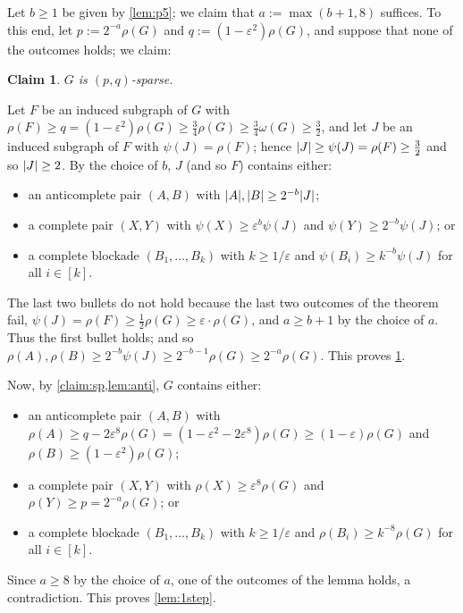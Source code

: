 \documentclass[11pt,reqno]{amsart}
\newtheorem{claim}{Claim}[theorem]
\let\oldendproof\endproof
\renewenvironment{proof}[1][\proofname]{%
	\oldproof[\normalfont\bfseries #1]%
}{\oldendproof}
\renewcommand{\qedsymbol}{$\blacksquare$}%
\newenvironment{subproof}[1][\normalfont\it Subproof]{%
	\renewcommand{\qedsymbol}{$\square$}%
	\begin{proof}[#1]%
	}{%
	\end{proof}%
}
\newcommand{\eps}{\varepsilon}
\DeclarePairedDelimiter\abs{\lvert}{\rvert}%
\begin{document}
	\begin{proof}
		Let $b\ge1$ be given by \cref{lem:p5}; we claim that $a:=\max(b+1,8)$ suffices.
		To this end, let $p:=2^{-a}\rho(G)$ and $q:=(1-\eps^2)\rho(G)$, and suppose that none of the outcomes holds; we claim:
		\begin{claim}
			\label{claim:sp}
			$G$ is $(p,q)$-sparse.
		\end{claim}
		\begin{subproof}
			Let $F$ be an induced subgraph of $G$ with $\rho(F)\ge q= (1-\eps^2)\rho(G)\ge\frac34\rho(G)\ge\frac34\omega(G)\ge\frac32$, and let $J$ be an induced subgraph of $F$ with $\psi(J)=\rho(F)$;
			hence $\abs J\ge \psi(J)=\rho(F)\ge\frac32$ and so $\abs J\ge2$.
			By the choice of $b$, $J$ (and so $F$) contains either:
			\begin{itemize}
				\item an anticomplete pair $(A,B)$ with $\abs A,\abs B\ge 2^{-b}\abs J$;
				
				\item a complete pair $(X,Y)$ with $\psi(X)\ge\eps^b\psi(J)$ and $\psi(Y)\ge 2^{-b}\psi(J)$; or
				
				\item a complete blockade $(B_1,\ldots,B_k)$ with $k\ge1/\eps$ and $\psi(B_i)\ge k^{-b}\psi(J)$ for all $i\in[k]$.
			\end{itemize}
			
			The last two bullets do not hold because the last two outcomes of the theorem fail, $\psi(J)=\rho(F)\ge\frac12\rho(G)\ge\eps\cdot\rho(G)$, and $a\ge b+1$ by the choice of $a$.
			Thus the first bullet holds; and so $\rho(A),\rho(B)\ge 2^{-b}\psi(J)\ge2^{-b-1}\rho(G)\ge 2^{-a}\rho(G)$.
			This proves \cref{claim:sp}.
		\end{subproof}
		
		Now, by \cref{claim:sp,lem:anti}, $G$ contains either:
		\begin{itemize}
			\item an anticomplete pair $(A,B)$ with $\rho(A)\ge q-2\eps^8\rho(G)=(1-\eps^2-2\eps^8)\rho(G)\ge(1-\eps)\rho(G)$ and $\rho(B)\ge(1-\eps^2)\rho(G)$;
			
			\item a complete pair $(X,Y)$ with $\rho(X)\ge\eps^8\rho(G)$ and $\rho(Y)\ge p=2^{-a}\rho(G)$; or
			
			\item a complete blockade $(B_1,\ldots,B_k)$ with $k\ge1/\eps$ and $\rho(B_i)\ge k^{-8}\rho(G)$ for all $i\in[k]$.
		\end{itemize}
		Since $a\ge 8$ by the choice of $a$,
		one of the outcomes of the lemma holds, a contradiction.
		This proves \cref{lem:1step}.
	\end{proof}
	
\end{document}
